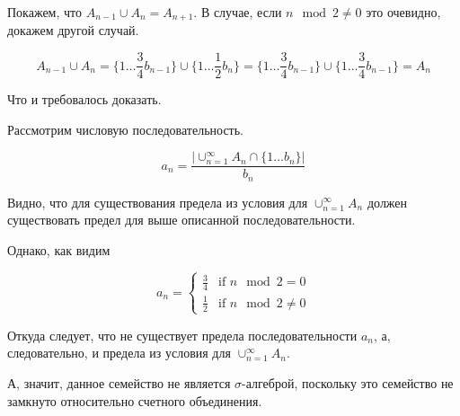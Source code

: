 \documentclass[12pt]{article}
\begin{document}
Покажем, что $A_{n-1}\cup A_n = A_{n+1}$. В случае, если $n \mod 2 \neq 0$ это очевидно, докажем другой случай.

$$A_{n-1}\cup A_n =  \{1\ldots\frac{3}{4}b_{n-1}\} \cup \{1\ldots\frac{1}{2}b_n\} = \{1\ldots\frac{3}{4}b_{n-1}\} \cup \{1\ldots\frac{3}{4}b_{n-1}\}=A_n$$

Что и требовалось доказать.

Рассмотрим числовую последовательность.

$$a_n = \frac{|\cup_{n=1}^{\infty} A_n \cap \{1\ldots b_n\}|}{b_n}$$

Видно, что для существования предела из условия для $\cup_{n=1}^{\infty} A_n$ должен существовать предел для выше описанной последовательности.

Однако, как видим

\begin{equation*}
a_n = 
 \begin{cases}
   \frac{3}{4} &\text{if  $n \mod 2 = 0$}\\
   \frac{1}{2} &\text{if $n \mod 2 \neq 0$}
 \end{cases}
\end{equation*}

Откуда следует, что не существует предела последовательности $a_n$, а, следовательно, и предела из условия для $\cup_{n=1}^{\infty} A_n$.

А, значит, данное семейство не является $\sigma$-алгеброй, поскольку это семейство не замкнуто относительно счетного объединения.
\end{document}

